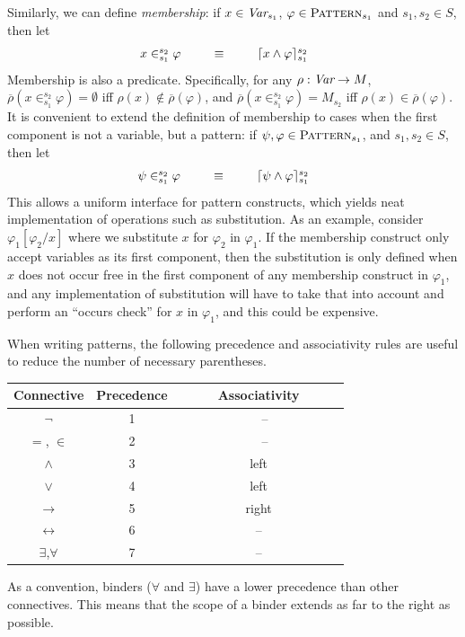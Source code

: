 \documentclass[UTF8,11pt]{article}
\theoremstyle{plain}
\theoremstyle{definition}
\theoremstyle{remark}
\newcommand{\Pattern}{\textsc{Pattern}\xspace}
\newcommand{\ra}{\rightarrow}
\begin{document}
Similarly, we can define \emph{membership}:
if $x\in\textit{Var}_{s_1}$, $\varphi\in\Pattern_{s_1}$ and $s_1,s_2\in S$, then
let
$$
\begin{array}{@{}rcll}
x \in_{s_1}^{s_2} \varphi & \ \ \ \ \ \equiv \ \ \ \ \ &
\lceil x \wedge \varphi\rceil_{s_1}^{s_2}
& %
\end{array}
$$
Membership is also a predicate.
Specifically, for any $\rho:\Var\ra M$,
$\overline{\rho}(x \in_{s_1}^{s_2} \varphi) = \emptyset$
iff $\rho(x) \not\in \overline{\rho}(\varphi)$, and
$\overline{\rho}(x \in_{s_1}^{s_2} \varphi) = M_{s_2}$
iff $\rho(x) \in \overline{\rho}(\varphi)$.
It is convenient to extend the definition of membership to cases when the first 
component is not a variable, but a pattern:
if $\psi, \varphi \in \Pattern_{s_1}$, and $s_1,s_2\in S$, 
then let
$$
\begin{array}{@{}rcll}
\psi \in_{s_1}^{s_2} \varphi & \ \ \ \ \ \equiv \ \ \ \ \ &
\lceil \psi \wedge \varphi\rceil_{s_1}^{s_2}
& %
\end{array}
$$
This allows a uniform interface for pattern constructs, which yields neat 
implementation of operations such as substitution.
As an example, consider $\varphi_1[\varphi_2 / x]$ where we 
substitute $x$ for $\varphi_2$ in $\varphi_1$.
If the membership construct only accept variables as its first component, then 
the substitution is only defined when $x$ does not occur free in the first 
component of any membership construct in $\varphi_1$, and any implementation of 
substitution will have to take that into account and perform an 
``occurs check'' for $x$ in $\varphi_1$, and this could be expensive.

When writing patterns, the following precedence and associativity rules are 
useful to reduce the 
number of necessary parentheses.
\begin{center}
	\begin{tabular}{c|c|c}
		Connective      &     Precedence & Associativity \\\hline
		$\neg$          &     1          & 　--　　　　　　　　　　　\\\hline
		$=$, $\in$      &     2          & 　--          　\\\hline
		$\wedge$        &     3          &  left         \\\hline
		$\vee$          &     4          &  left         \\\hline
		$\to$           &     5          &  right        \\\hline
		$\leftrightarrow$ &   6          &  --           \\\hline
		$\exists$,$\forall$ & 7          &  --           \\\hline
	\end{tabular}
\end{center}
As a convention, binders ($\forall$ and $\exists$) have a lower precedence than 
other connectives.
This means that the scope of a binder extends as far to the right as possible. 
\end{document}
